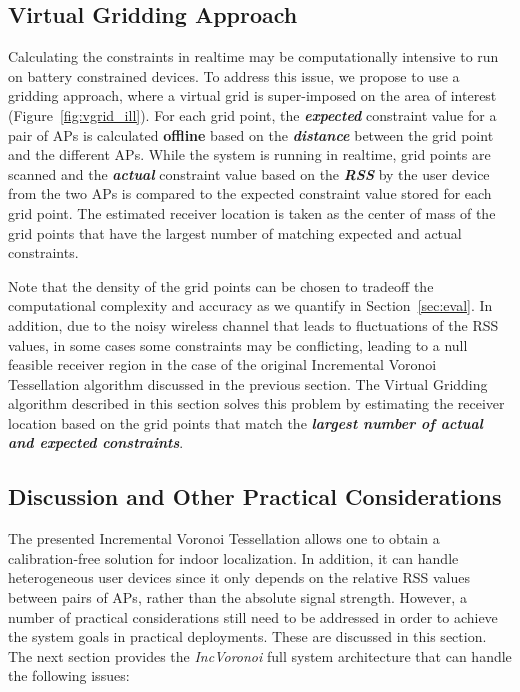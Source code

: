 \documentclass[conference]{IEEEtran}
\def \sys {\textit{IncVoronoi}}
\begin{document}
\subsection{Virtual Gridding Approach}
\label{sec:vgrid}
Calculating the constraints in realtime may be computationally intensive to run on battery constrained devices. 
 To address this issue, we propose to use a gridding approach, where a virtual grid is super-imposed on the area of interest (Figure~\ref{fig:vgrid_ill}). For each grid point, the \textbf{\emph{expected}} constraint value for a pair of APs is calculated \textbf{offline} based on the \textbf{\emph{distance}} between the grid point and the different APs. While the system is running in realtime, grid points are scanned and the \emph{\textbf{actual}} constraint value based on the \textbf{\emph{RSS}} by the user device from the two APs is compared to the expected constraint value stored for each grid point. The estimated receiver location is taken as the center of mass of the grid points that have the largest number of matching expected and actual constraints.

Note that the density of the grid points can be chosen to tradeoff the computational complexity and accuracy as we quantify in Section~\ref{sec:eval}. In addition, due to the noisy wireless channel that leads to fluctuations of the RSS values, in some cases some constraints may be conflicting, leading to a null feasible receiver region in the case of the original Incremental Voronoi Tessellation algorithm discussed in the previous section. The Virtual Gridding algorithm described in this section solves this problem by estimating the receiver location based on the  grid points that match the \textbf{\emph{largest number of actual and expected constraints}}.
\subsection{Discussion and Other Practical Considerations}
The presented Incremental Voronoi Tessellation allows one to obtain a calibration-free solution for indoor localization. In addition, it can handle heterogeneous user devices since it only depends on the relative RSS values between pairs of APs, rather than the absolute signal strength.
However, a number of practical considerations still need to be addressed in order to achieve the system goals in practical deployments. These are discussed in this section. The next section provides the \sys{} full system architecture that can handle the following issues:
\end{document}
